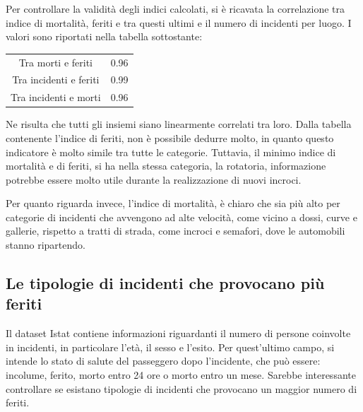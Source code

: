 \documentclass[a4paper,12pt]{report}
\begin{document}
Per controllare la validità degli indici calcolati, si è ricavata la correlazione 
tra indice di mortalità, feriti e tra questi ultimi e il numero di incidenti per 
luogo.
I valori sono riportati nella tabella sottostante: 

\begin{center}
    \def\arraystretch{1.5}%
    \begin{tabular}{ |c|c| }
        \hline
        \rowcolor{TableGray}
        Tra morti e feriti      & 0.96 \\ 
        Tra incidenti e feriti  & 0.99 \\
        \rowcolor{TableGray}
        Tra incidenti e morti   & 0.96 \\
        \hline
    \end{tabular}
\end{center}

Ne risulta che tutti gli insiemi siano linearmente correlati tra loro. 
Dalla tabella contenente l'indice di feriti, non è possibile dedurre molto, 
in quanto questo indicatore è molto simile tra tutte le categorie. 
Tuttavia, il minimo indice di mortalità e di feriti, si ha nella stessa categoria, 
la rotatoria, informazione potrebbe essere molto utile durante la realizzazione di nuovi 
incroci.

Per quanto riguarda invece, l'indice di mortalità, è chiaro che sia più alto 
per categorie di incidenti che avvengono ad alte velocità, come vicino a dossi, 
curve e gallerie, rispetto a tratti di strada, come incroci e semafori, 
dove le automobili stanno ripartendo.

\subsection{Le tipologie di incidenti che provocano più feriti}

Il dataset Istat contiene informazioni riguardanti il numero di persone coinvolte 
in incidenti, in particolare l'età, il sesso e l'esito. 
Per quest'ultimo campo, si intende lo stato di salute del passeggero 
dopo l'incidente, che può essere: incolume, ferito, morto entro 24 ore o morto entro un mese.
Sarebbe interessante controllare se esistano tipologie di incidenti che provocano 
un maggior numero di feriti.
\end{document}
